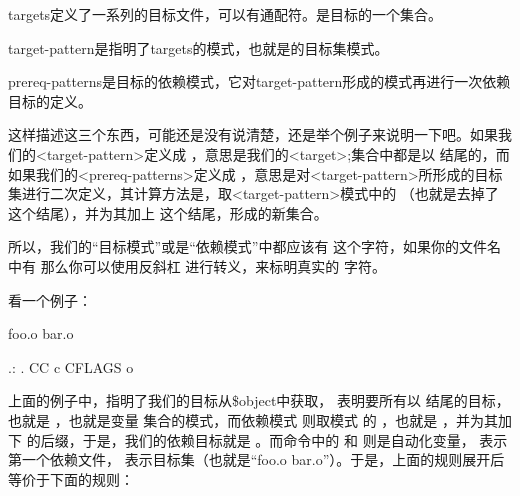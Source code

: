 \documentclass[a4paper,10pt]{sphinxmanual}
\begin{document}
targets定义了一系列的目标文件，可以有通配符。是目标的一个集合。

target-pattern是指明了targets的模式，也就是的目标集模式。

prereq-patterns是目标的依赖模式，它对target-pattern形成的模式再进行一次依赖目标的定义。

这样描述这三个东西，可能还是没有说清楚，还是举个例子来说明一下吧。如果我们的\textless{}target-pattern\textgreater{}定义成  ，意思是我们的\textless{}target\textgreater{};集合中都是以  结尾的，而如果我们的\textless{}prereq-patterns\textgreater{}定义成  ，意思是对\textless{}target-pattern\textgreater{}所形成的目标集进行二次定义，其计算方法是，取\textless{}target-pattern\textgreater{}模式中的 \sphinxcode{\sphinxupquote{\%}} （也就是去掉了  这个结尾），并为其加上  这个结尾，形成的新集合。

所以，我们的“目标模式”或是“依赖模式”中都应该有 \sphinxcode{\sphinxupquote{\%}} 这个字符，如果你的文件名中有 \sphinxcode{\sphinxupquote{\%}} 那么你可以使用反斜杠 \sphinxcode{\sphinxupquote{\textbackslash{}}} 进行转义，来标明真实的 \sphinxcode{\sphinxupquote{\%}} 字符。

看一个例子：

\begin{sphinxVerbatim}[commandchars=\\\{\}]
  foo.o bar.o

 

 \PYGZpc{}.: \PYGZpc{}.
    CC \PYGZhy{}c CFLAGS \PYGZdl{}\PYGZlt{} \PYGZhy{}o 
\end{sphinxVerbatim}

上面的例子中，指明了我们的目标从\$object中获取，  表明要所有以  结尾的目标，也就是  ，也就是变量  集合的模式，而依赖模式  则取模式
 的 \sphinxcode{\sphinxupquote{\%}} ，也就是  ，并为其加下  的后缀，于是，我们的依赖目标就是  。而命令中的 \sphinxcode{\sphinxupquote{\$\textless{}}} 和  则是自动化变量， \sphinxcode{\sphinxupquote{\$\textless{}}} 表示第一个依赖文件，
 表示目标集（也就是“foo.o bar.o”）。于是，上面的规则展开后等价于下面的规则：
\end{document}
